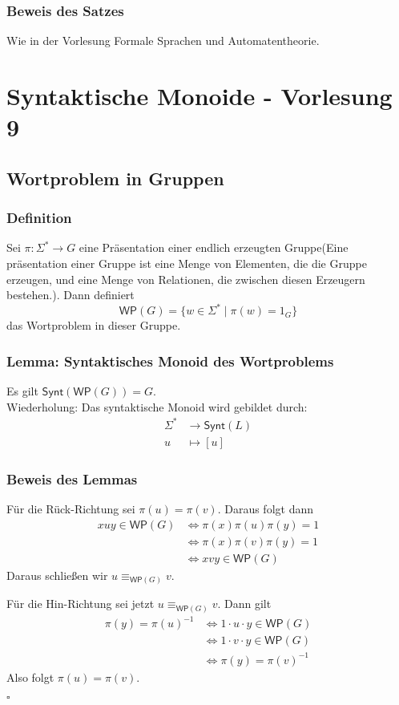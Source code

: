 \documentclass[12pt, german]{article}
\newcommand{\sigstern}{\Sigma^\ast}
\newcommand{\inv}{^{-1}}
\newcommand{\synt}{\mathsf{Synt}}
\newcommand{\wop}{\mathsf{WP}}
\newcommand{\equivWP}{\equiv_{\mathsf{WP}(G)}}
\newcommand{\bewiesen}{
	
	\begin{flushright}
		$\square$  \\
\end{flushright}}
\begin{document}
	\subsubsection{Beweis des Satzes}
	Wie in der Vorlesung Formale Sprachen und Automatentheorie.
	
	\section{Syntaktische Monoide - Vorlesung 9}
	\subsection{Wortproblem in Gruppen}
	\subsubsection{Definition}
	Sei $\pi : \sigstern \to G$ eine Präsentation einer endlich erzeugten Gruppe(Eine präsentation einer Gruppe ist eine Menge von Elementen, die die Gruppe erzeugen, und eine Menge von Relationen, die zwischen diesen Erzeugern bestehen.). Dann definiert $$\wop(G) = \{ w \in \sigstern \mid \pi(w)=1_G\}$$das Wortproblem in dieser Gruppe.
	
	\subsubsection{Lemma: Syntaktisches Monoid des Wortproblems}
	Es gilt $\synt(\wop(G))=G$.\\
	Wiederholung: Das syntaktische Monoid wird gebildet durch: 
	\begin{align*}
		\sigstern &\to \synt(L) \\
		u &\mapsto [u]
	\end{align*}
	
	\subsubsection{Beweis des Lemmas}
	Für die Rück-Richtung sei $\pi(u) = \pi(v)$. Daraus folgt dann
	\begin{align*}
		xuy \in \wop(G) &\iff \pi(x)\pi(u)\pi(y) = 1  \\
		&\iff \pi(x)\pi(v)\pi(y) = 1 \\
		&\iff xvy \in \wop(G)
	\end{align*}
	Daraus schlie\ss en wir $u \equivWP v$.
	\newline
	
	Für die Hin-Richtung sei jetzt $u \equivWP v$. Dann gilt 
	\begin{align*}
		\pi(y) = \pi(u)\inv &\iff  1\cdot u \cdot y \in \wop(G)\\
		&\iff 1\cdot v \cdot y \in \wop(G)\\
		&\iff \pi(y) = \pi(v)\inv
	\end{align*}
	Also folgt $\pi(u) = \pi(v)$.
	\bewiesen
	
\end{document}

